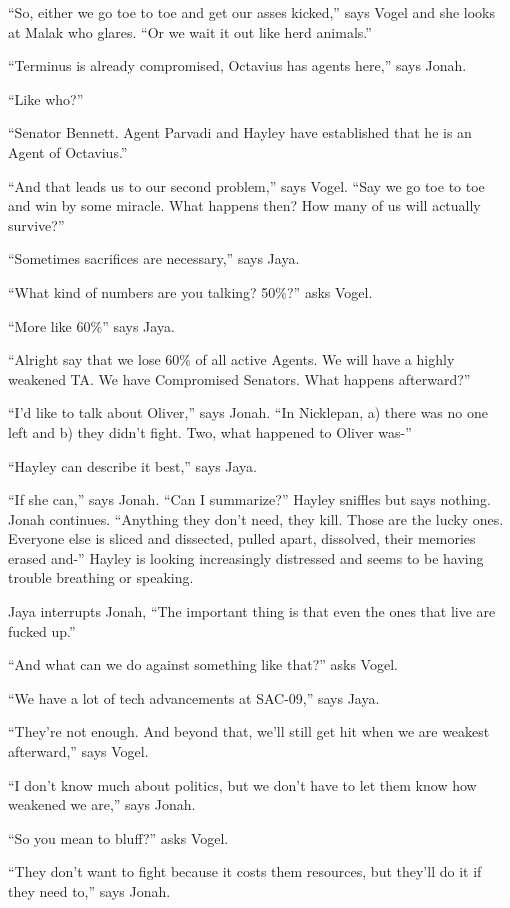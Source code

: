 ``So, either we go toe to toe and get our asses kicked,'' says Vogel and she looks at Malak who glares. ``Or we wait it out like herd animals.''

``Terminus is already compromised, Octavius has agents here,'' says Jonah.

``Like who?''

``Senator Bennett.  Agent Parvadi and Hayley have established that he is an Agent of Octavius.''

``And that leads us to our second problem,'' says Vogel.  ``Say we go toe to toe and win by some miracle.  What happens then?  How many of us will actually survive?''

``Sometimes sacrifices are necessary,'' says Jaya.

``What kind of numbers are you talking?  50\%?'' asks Vogel.

``More like 60\%'' says Jaya.

``Alright say that we lose 60\% of all active Agents.  We will have a highly weakened TA.  We have Compromised Senators.  What happens afterward?''

``I'd like to talk about Oliver,'' says Jonah.  ``In Nicklepan, a) there was no one left and b) they didn't fight.  Two, what happened to Oliver was-''

``Hayley can describe it best,'' says Jaya.

``If she can,'' says Jonah.  ``Can I summarize?''  Hayley sniffles but says nothing.  Jonah continues.  ``Anything they don't need, they kill.  Those are the lucky ones.  Everyone else is sliced and dissected, pulled apart, dissolved, their memories erased and-''  Hayley is looking increasingly distressed and seems to be having trouble breathing or speaking.  

Jaya interrupts Jonah, ``The important thing is that even the ones that live are fucked up.''

``And what can we do against something like that?'' asks Vogel.

``We have a lot of tech advancements at SAC-09,'' says Jaya.

``They're not enough.  And beyond that, we'll still get hit when we are weakest afterward,'' says Vogel.

``I don't know much about politics, but we don't have to let them know how weakened we are,'' says Jonah.

``So you mean to bluff?'' asks Vogel.

``They don't want to fight because it costs them resources, but they'll do it if they need to,'' says Jonah.

